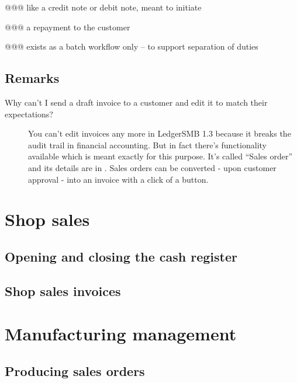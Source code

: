@@@ like a credit note or debit note, meant to initiate

@@@ a repayment to the customer

@@@ exists as a batch workflow only -- to support separation of duties


\section{Remarks}
\label{sec-business-processes-accounting-remarks}


\begin{description}
\item [Why can't I send a draft invoice to a \gls{customer} and edit it
   to match their expectations?] 
You can't edit invoices any more in LedgerSMB 1.3 because it breaks the audit trail
in financial accounting. But in fact there's functionality available which is meant
exactly for this purpose. It's called ``Sales order'' and its details are in
. Sales orders can be converted - upon \gls{customer} approval -
into an invoice with a click of a button.
\end{description}


\chapter{Shop sales}
\label{cha-business-processes-shop-sales}

\section{Opening and closing the cash register}
\label{sec-business-processes-shop-register-opening-closing}

\section{Shop sales invoices}
\label{sec-business-processes-shop-invoicing}

\chapter{Manufacturing management}
\label{cha-business-processes-manufacturing}

\section{Producing sales orders}
\label{sec-business-processes-manufacturing-producing-orders}


